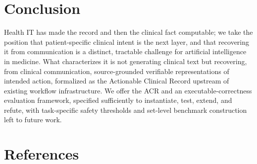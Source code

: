 \section{Conclusion}\label{conclusion}

Health IT has made the record and then the clinical fact computable; we take the position that patient-specific clinical intent is the next layer, and that recovering it from communication is a distinct, tractable challenge for artificial intelligence in medicine. What characterizes it is not generating clinical text but recovering, from clinical communication, source-grounded verifiable representations of intended action, formalized as the Actionable Clinical Record upstream of existing workflow infrastructure. We offer the ACR and an executable-correctness evaluation framework, specified sufficiently to instantiate, test, extend, and refute, with task-specific safety thresholds and set-level benchmark construction left to future work.

\section{References}\label{references}
